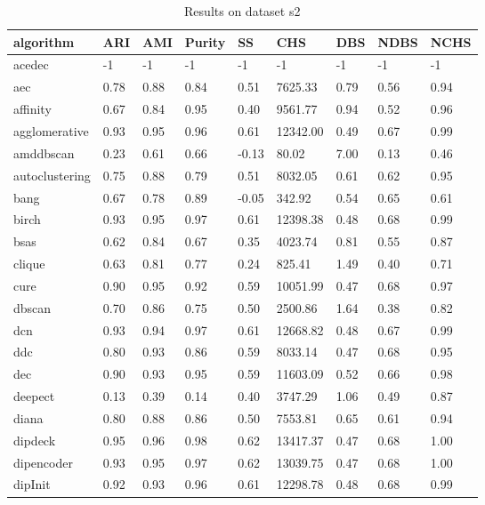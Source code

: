 \begin{table}[H]
\centering
\caption{Results on dataset s2}
\label{tab:params:s2}
\begin{tabular}{|l|l|l|l|l|l|l|l|l|}
\hline
algorithm & ARI & AMI & Purity & SS & CHS & DBS & NDBS & NCHS \\
\hline
acedec & -1 & -1 & -1 & -1 & -1 & -1 & -1 & -1 \\
\hline
aec & 0.78 & 0.88 & 0.84 & 0.51 & 7625.33 & 0.79 & 0.56 & 0.94 \\
\hline
affinity & 0.67 & 0.84 & 0.95 & 0.40 & 9561.77 & 0.94 & 0.52 & 0.96 \\
\hline
agglomerative & 0.93 & 0.95 & 0.96 & 0.61 & 12342.00 & 0.49 & 0.67 & 0.99 \\
\hline
amddbscan & 0.23 & 0.61 & 0.66 & -0.13 & 80.02 & 7.00 & 0.13 & 0.46 \\
\hline
autoclustering & 0.75 & 0.88 & 0.79 & 0.51 & 8032.05 & 0.61 & 0.62 & 0.95 \\
\hline
bang & 0.67 & 0.78 & 0.89 & -0.05 & 342.92 & 0.54 & 0.65 & 0.61 \\
\hline
birch & 0.93 & 0.95 & 0.97 & 0.61 & 12398.38 & 0.48 & 0.68 & 0.99 \\
\hline
bsas & 0.62 & 0.84 & 0.67 & 0.35 & 4023.74 & 0.81 & 0.55 & 0.87 \\
\hline
clique & 0.63 & 0.81 & 0.77 & 0.24 & 825.41 & 1.49 & 0.40 & 0.71 \\
\hline
cure & 0.90 & 0.95 & 0.92 & 0.59 & 10051.99 & 0.47 & 0.68 & 0.97 \\
\hline
dbscan & 0.70 & 0.86 & 0.75 & 0.50 & 2500.86 & 1.64 & 0.38 & 0.82 \\
\hline
dcn & 0.93 & 0.94 & 0.97 & 0.61 & 12668.82 & 0.48 & 0.67 & 0.99 \\
\hline
ddc & 0.80 & 0.93 & 0.86 & 0.59 & 8033.14 & 0.47 & 0.68 & 0.95 \\
\hline
dec & 0.90 & 0.93 & 0.95 & 0.59 & 11603.09 & 0.52 & 0.66 & 0.98 \\
\hline
deepect & 0.13 & 0.39 & 0.14 & 0.40 & 3747.29 & 1.06 & 0.49 & 0.87 \\
\hline
diana & 0.80 & 0.88 & 0.86 & 0.50 & 7553.81 & 0.65 & 0.61 & 0.94 \\
\hline
dipdeck & 0.95 & 0.96 & 0.98 & 0.62 & 13417.37 & 0.47 & 0.68 & 1.00 \\
\hline
dipencoder & 0.93 & 0.95 & 0.97 & 0.62 & 13039.75 & 0.47 & 0.68 & 1.00 \\
\hline
dipInit & 0.92 & 0.93 & 0.96 & 0.61 & 12298.78 & 0.48 & 0.68 & 0.99 \\

\end{tabular}
\end{table}
